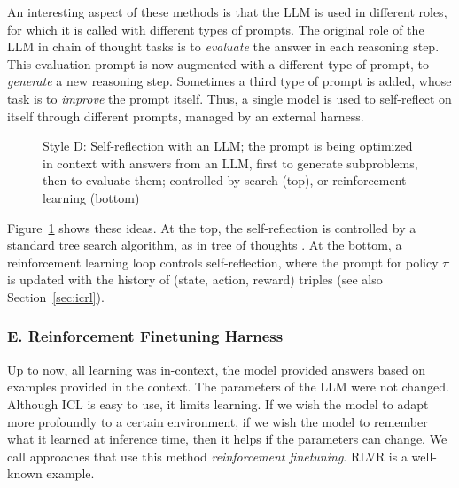 An interesting aspect of these methods is that  the LLM is
used in different roles, for which it is called with different types of prompts. The original  role of the LLM in chain of thought
tasks is to {\em evaluate} the answer in each reasoning step. This evaluation prompt is now augmented with
a different type of prompt, to {\em generate} a new reasoning step. Sometimes a third type of prompt is added, whose task is to {\em improve} the prompt
itself. Thus, a single model is used to self-reflect on itself through different prompts, managed by an external harness.

\begin{figure}
  \begin{center}
    
    \caption{Style D: Self-reflection with an LLM;
      the prompt is being optimized in context with answers from an
      LLM, first to generate subproblems, then to evaluate them; controlled by search (top), or reinforcement learning
     (bottom)}\label{fig:rlD} 
  \end{center}
\end{figure}


Figure~\ref{fig:rlD} shows these ideas. At the top, the self-reflection is controlled by a standard tree search algorithm, as in tree of thoughts \citep{yao2024tree}. At the bottom, a reinforcement learning loop controls self-reflection, where the prompt for policy $\pi$ is  updated with the history of (state, action, reward) triples (see also Section~\ref{sec:icrl}). 
 




\subsubsection{E. Reinforcement Finetuning Harness}
Up to now, all learning was in-context, the model provided answers based on  examples provided in the context. The parameters of the LLM were not
changed. Although ICL is easy to use, it limits learning. If we wish the model to adapt more profoundly to a certain environment,  if we wish the model to remember what it learned at inference time,  then it helps if the parameters can change. We call approaches that use this method  {\em reinforcement finetuning}. RLVR is a well-known example. %


